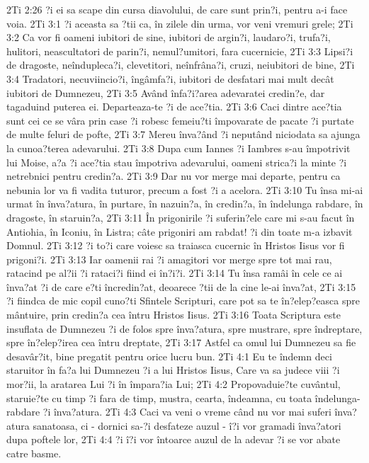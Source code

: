 2Ti 2:26  ?i ei sa scape din cursa diavolului, de care sunt prin?i, pentru a-i face voia.
2Ti 3:1  ?i aceasta sa ?tii ca, în zilele din urma, vor veni vremuri grele;
2Ti 3:2  Ca vor fi oameni iubitori de sine, iubitori de argin?i, laudaro?i, trufa?i, hulitori, neascultatori de parin?i, nemul?umitori, fara cucernicie,
2Ti 3:3  Lipsi?i de dragoste, neîndupleca?i, clevetitori, neînfrâna?i, cruzi, neiubitori de bine,
2Ti 3:4  Tradatori, necuviincio?i, îngâmfa?i, iubitori de desfatari mai mult decât iubitori de Dumnezeu,
2Ti 3:5  Având înfa?i?area adevaratei credin?e, dar tagaduind puterea ei. Departeaza-te ?i de ace?tia.
2Ti 3:6  Caci dintre ace?tia sunt cei ce se vâra prin case ?i robesc femeiu?ti împovarate de pacate ?i purtate de multe feluri de pofte,
2Ti 3:7  Mereu înva?ând ?i neputând niciodata sa ajunga la cunoa?terea adevarului.
2Ti 3:8  Dupa cum Iannes ?i Iambres s-au împotrivit lui Moise, a?a ?i ace?tia stau împotriva adevarului, oameni strica?i la minte ?i netrebnici pentru credin?a.
2Ti 3:9  Dar nu vor merge mai departe, pentru ca nebunia lor va fi vadita tuturor, precum a fost ?i a acelora.
2Ti 3:10  Tu însa mi-ai urmat în înva?atura, în purtare, în nazuin?a, în credin?a, în îndelunga rabdare, în dragoste, în staruin?a,
2Ti 3:11  În prigonirile ?i suferin?ele care mi s-au facut în Antiohia, în Iconiu, în Listra; câte prigoniri am rabdat! ?i din toate m-a izbavit Domnul.
2Ti 3:12  ?i to?i care voiesc sa traiasca cucernic în Hristos Iisus vor fi prigoni?i.
2Ti 3:13  Iar oamenii rai ?i amagitori vor merge spre tot mai rau, ratacind pe al?ii ?i rataci?i fiind ei în?i?i.
2Ti 3:14  Tu însa ramâi în cele ce ai înva?at ?i de care e?ti încredin?at, deoarece ?tii de la cine le-ai înva?at,
2Ti 3:15  ?i fiindca de mic copil cuno?ti Sfintele Scripturi, care pot sa te în?elep?easca spre mântuire, prin credin?a cea întru Hristos Iisus.
2Ti 3:16  Toata Scriptura este insuflata de Dumnezeu ?i de folos spre înva?atura, spre mustrare, spre îndreptare, spre în?elep?irea cea întru dreptate,
2Ti 3:17  Astfel ca omul lui Dumnezeu sa fie desavâr?it, bine pregatit pentru orice lucru bun.
2Ti 4:1  Eu te îndemn deci staruitor în fa?a lui Dumnezeu ?i a lui Hristos Iisus, Care va sa judece viii ?i mor?ii, la aratarea Lui ?i în împara?ia Lui;
2Ti 4:2  Propovaduie?te cuvântul, staruie?te cu timp ?i fara de timp, mustra, cearta, îndeamna, cu toata îndelunga-rabdare ?i înva?atura.
2Ti 4:3  Caci va veni o vreme când nu vor mai suferi înva?atura sanatoasa, ci - dornici sa-?i desfateze auzul - î?i vor gramadi înva?atori dupa poftele lor,
2Ti 4:4  ?i î?i vor întoarce auzul de la adevar ?i se vor abate catre basme.
